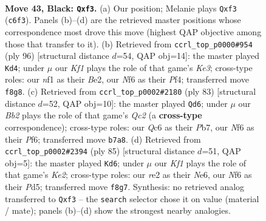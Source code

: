 \documentclass[11pt]{article}
\begin{document}
\clearpage

\begin{figure}[p]\centering
\begin{subfigure}{0.46\textwidth}\centering
\resizebox{\linewidth}{!}{%
\newchessgame
\chessboard[
  setfen={5k2/1b3p2/2q2np1/7p/8/5PP1/1R2R2P/5NK1 b - - 0 43},
  showmover=false,
  pgfstyle=straightmove, color=movearrow, markmove={c6-f3}
]}
\caption{}
\end{subfigure}\hfill
\begin{subfigure}{0.46\textwidth}\centering
\resizebox{\linewidth}{!}{%
\newchessgame
\chessboard[
  setfen={R1b5/2r2np1/3kp2p/7P/5PN1/4K1P1/4B3/8 w - - 9 49},
  showmover=false,
  pgfstyle=straightmove, color=movearrow, markmove={e3-d4}
]}
\caption{}
\end{subfigure}
\\[4pt]
\begin{subfigure}{0.46\textwidth}\centering
\resizebox{\linewidth}{!}{%
\newchessgame
\chessboard[
  setfen={8/1pq3pk/5p2/7p/1P6/5PP1/2R1R1KP/8 b - - 3 42},
  showmover=false,
  pgfstyle=straightmove, color=movearrow, markmove={c7-d6}
]}
\caption{}
\end{subfigure}\hfill
\begin{subfigure}{0.46\textwidth}\centering
\resizebox{\linewidth}{!}{%
\newchessgame
\chessboard[
  setfen={8/4k3/4np2/3p2p1/1r1P4/1N3P2/P2R2P1/3K4 b - - 11 43},
  showmover=false,
  pgfstyle=straightmove, color=movearrow, markmove={e7-d6}
]}
\caption{}
\end{subfigure}
\caption{\textbf{Move 43, Black: \texttt{Qxf3}.} (a) Our position; Melanie plays \texttt{Qxf3} (\texttt{c6f3}). Panels (b)--(d) are the retrieved master positions whose correspondence most drove this move (highest QAP objective among those that transfer to it). (b) Retrieved from \texttt{ccrl\_top\_p0000\#954} (ply 96) [structural distance $d$=54, QAP obj=14]: the master played \texttt{Kd4}; under $\mu$ our \emph{Kf1} plays the role of that game's \emph{Ke3}; cross-type roles: our \emph{n}f1 as their \emph{B}e2, our \emph{N}f6 as their \emph{P}f4; transferred move \texttt{f8g8}. (c) Retrieved from \texttt{ccrl\_top\_p0002\#2180} (ply 83) [structural distance $d$=52, QAP obj=10]: the master played \texttt{Qd6}; under $\mu$ our \emph{Bb2} plays the role of that game's \emph{Qc2} (a \textbf{cross-type} correspondence); cross-type roles: our \emph{Q}c6 as their \emph{P}b7, our \emph{N}f6 as their \emph{P}f6; transferred move \texttt{b7a8}. (d) Retrieved from \texttt{ccrl\_top\_p0002\#2394} (ply 85) [structural distance $d$=51, QAP obj=5]: the master played \texttt{Kd6}; under $\mu$ our \emph{Kf1} plays the role of that game's \emph{Ke2}; cross-type roles: our \emph{r}e2 as their \emph{N}e6, our \emph{N}f6 as their \emph{P}d5; transferred move \texttt{f8g7}. Synthesis: no retrieved analog transferred to \texttt{Qxf3} -- the \texttt{search} selector chose it on value (material / mate); panels (b)--(d) show the strongest nearby analogies.}
\label{fig:thought-m85}
\end{figure}
\end{document}
